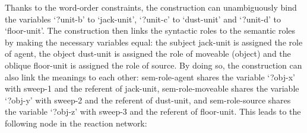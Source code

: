 Thanks to the word-order constraints, the construction can unambiguously bind the variables `?unit-b' to `jack-unit', `?unit-c' to `dust-unit' and `?unit-d' to `floor-unit'. The construction then links the syntactic roles to the semantic roles by making the necessary variables equal: the subject jack-unit is assigned the role of agent, the object dust-unit is assigned the role of moveable (object) and the oblique floor-unit is assigned the role of source. By doing so, the construction can also link the meanings to each other: sem-role-agent shares the variable `?obj-x' with sweep-1 and the referent of jack-unit, sem-role-moveable shares the variable `?obj-y' with sweep-2 and the referent of dust-unit, and sem-role-source shares the variable `?obj-z' with sweep-3 and the referent of floor-unit. This leads to the following node in the reaction network:
\\
\\

